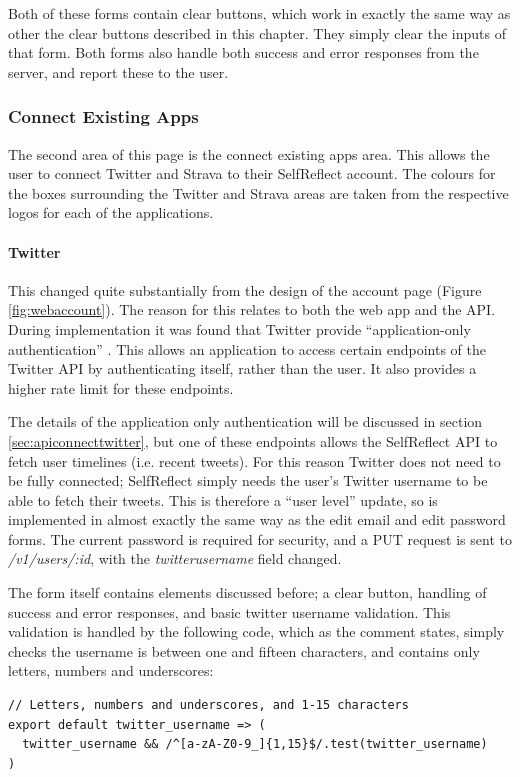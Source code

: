 \documentclass[11pt,openright,a4paper]{report}
\begin{document}
Both of these forms contain clear buttons, which work in exactly the same way as other the clear buttons described in this chapter. They simply clear the inputs of that form. Both forms also handle both success and error responses from the server, and report these to the user.

\subsubsection{Connect Existing Apps} \label{subsec:webconnectapis}
The second area of this page is the connect existing apps area. This allows the user to connect Twitter and Strava to their SelfReflect account. The colours for the boxes surrounding the Twitter and Strava areas are taken from the respective logos for each of the applications.

\paragraph{Twitter} This changed quite substantially from the design of the account page (Figure \ref{fig:webaccount}). The reason for this relates to both the web app and the API. During implementation it was found that Twitter provide \enquote{application-only authentication} \parencite{twitterapponly}. This allows an application to access certain endpoints of the Twitter API by authenticating itself, rather than the user. It also provides a higher rate limit for these endpoints.

The details of the application only authentication will be discussed in section \ref{sec:apiconnecttwitter}, but one of these endpoints allows the SelfReflect API to fetch user timelines (i.e. recent tweets). For this reason Twitter does not need to be fully connected; SelfReflect simply needs the user's Twitter username to be able to fetch their tweets. This is therefore a \enquote{user level} update, so is implemented in almost exactly the same way as the edit email and edit password forms. The current password is required for security, and a PUT request is sent to \emph{/v1/users/:id}, with the \emph{twitter\textunderscore username} field changed.

The form itself contains elements discussed before; a clear button, handling of success and error responses, and basic twitter username validation. This validation is handled by the following code, which as the comment states, simply checks the username is between one and fifteen characters, and contains only letters, numbers and underscores:
\begin{lstlisting}
// Letters, numbers and underscores, and 1-15 characters
export default twitter_username => (
  twitter_username && /^[a-zA-Z0-9_]{1,15}$/.test(twitter_username)
)
\end{lstlisting}
\end{document}
